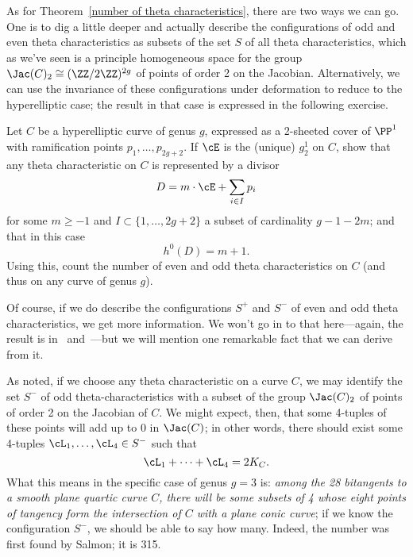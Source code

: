 As for Theorem~\ref{number of theta characteristics}, there are two ways we can go. One is to dig a little deeper and actually describe the configurations of odd and even theta characteristics as subsets of the set $S$ of all theta characteristics, which as we've seen is a principle homogeneous space for the group $\Jac(C)_2 \cong (\ZZ/2\ZZ)^{2g}$ of points of order 2 on the Jacobian. Alternatively, we can use the invariance of these configurations under deformation to reduce to the hyperelliptic case; the result in that case is expressed in the following exercise.

\begin{exercise}
Let $C$ be a hyperelliptic curve of genus $g$, expressed as a 2-sheeted cover of $\PP^1$ with ramification points $p_1,\dots,p_{2g+2}$. If $\cE$ is the (unique) $g^1_2$ on $C$, show that any theta characteristic on $C$ is represented by a divisor
$$
D = m\cdot \cE + \sum_{i \in I} p_i
$$
for some $m \geq -1$ and $I \subset \{1,\dots, 2g+2\}$ a subset of cardinality $g-1-2m$; and that in this case
$$
h^0(D) = m+1.
$$
Using this, count the number of even and odd theta characteristics on $C$ (and thus on any curve of genus $g$).
\end{exercise}

Of course, if we do describe the configurations $S^+$ and $S^-$ of even and odd theta characteristics, we get more information. We won't go in to that here---again, the result is in~\cite{Mumford} and~\cite{JH paper}---but we will mention one remarkable fact that we can derive from it.

As noted, if we choose any theta characteristic on a curve $C$, we may identify the set $S^-$ of odd theta-characteristics with a subset of the group $\Jac(C)_2$ of points of order 2 on the Jacobian of $C$. We might expect, then, that some 4-tuples of these points will add up to 0 in $\Jac(C)$; in other words, there should exist some 4-tuples $\cL_1,\dots,\cL_4 \in S^-$ such that
$$
\cL_1+ \dots +\cL_4 = 2K_C.
$$
What this means in the specific case of genus $g=3$ is: \emph{among the 28 bitangents to a smooth plane quartic curve $C$, there will be some subsets of 4 whose eight points of tangency form the intersection of $C$ with a plane conic curve}; if we know the configuration $S^-$, we should be able to say how many. Indeed, the number was first found by Salmon; it is 315.







